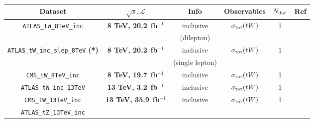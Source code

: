 
\begin{table}[t]
  \centering
  \scriptsize
   \renewcommand{\arraystretch}{1.60}
  \begin{tabular}{c|c|c|c|c|c}
 Dataset   &  $\sqrt{s}, \mathcal{L}$ & Info  &  Observables  & $N_{\rm dat}$ & Ref   \\
\toprule
\multirow{2}{*}{ {\tt ATLAS\_tW\_8TeV\_inc}}      &
\multirow{2}{*}{{\bf 8 TeV, 20.2}~{\rm \bf fb}$^{-1}$}   & \multirow{1}{*}{inclusive}   &
\multirow{2}{*}{$\sigma_{\rm tot}(tW)$}  &  1  &
\multirow{2}{*}{\cite{Aad:2015eto}}  \\
    &
  & \multirow{1}{*}{(dilepton)}   &
  &   &\\
\toprule
\multirow{2}{*}{ {\tt ATLAS\_tW\_inc\_slep\_8TeV} {\bf (*)}}      &
\multirow{2}{*}{{\bf 8 TeV, 20.2}~{\rm \bf fb}$^{-1}$}   & \multirow{1}{*}{inclusive}   &
\multirow{2}{*}{$\sigma_{\rm tot}(tW)$}  &  1  &
\multirow{2}{*}{\cite{Aad:2020zhd}}  \\
    &
  & \multirow{1}{*}{(single lepton)}   &
  &   &\\
\midrule
      \multirow{1}{*}{ {\tt CMS\_tW\_8TeV\_inc}}      &
 \multirow{1}{*}{{\bf 8 TeV, 19.7}~{\rm \bf fb}$^{-1}$}   & \multirow{1}{*}{inclusive}   &
\multirow{1}{*}{$\sigma_{\rm tot}(tW)$}  &  1  &
\multirow{1}{*}{\cite{Chatrchyan:2014tua}}  \\
\midrule
        \multirow{1}{*}{ {\tt ATLAS\_tW\_inc\_13TeV}}      &
 \multirow{1}{*}{{\bf 13 TeV, 3.2}~{\rm \bf fb}$^{-1}$}   & \multirow{1}{*}{inclusive}   &
\multirow{1}{*}{$\sigma_{\rm tot}(tW)$}  &  1  &
\multirow{1}{*}{\cite{Aaboud:2016lpj}}  \\
\midrule
     \multirow{1}{*}{ {\tt CMS\_tW\_13TeV\_inc}}      &
 \multirow{1}{*}{{\bf 13 TeV, 35.9}~{\rm \bf fb}$^{-1}$}   & \multirow{1}{*}{inclusive}   &
\multirow{1}{*}{$\sigma_{\rm tot}(tW)$}  &  1  &
\multirow{1}{*}{\cite{Sirunyan:2018lcp}}  \\
\midrule
\midrule
      \multirow{1}{*}{ {\tt ATLAS\_tZ\_13TeV\_inc}}      &

\end{tabular}
\end{table}
